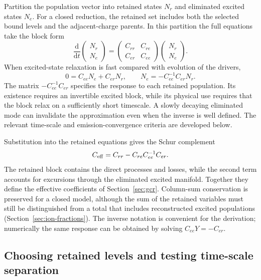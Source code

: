 \documentclass[11pt,a4paper]{article}
\newcommand{\dd}{\mathrm{d}}
\numberwithin{equation}{section}
\begin{document}
Partition the population vector into retained states $N_r$ and eliminated
excited states $N_e$. For a closed reduction, the retained set includes
both the selected bound levels and the adjacent-charge parents. In this
partition the full equations take the block form
\begin{equation}\label{eq:blocks}
 \frac{\dd}{\dd t}\begin{pmatrix}N_r\\N_e\end{pmatrix}
 =\begin{pmatrix}C_{rr}&C_{re}\\C_{er}&C_{ee}\end{pmatrix}
  \begin{pmatrix}N_r\\N_e\end{pmatrix}.
\end{equation}
When excited-state relaxation is fast compared with evolution of the drivers,
\begin{equation}\label{eq:qs}
 0=C_{ee}N_e+C_{er}N_r,
 \qquad N_e=-C_{ee}^{-1}C_{er}N_r.
\end{equation}
The matrix $-C_{ee}^{-1}C_{er}$ specifies the response to each retained
population. Its existence requires an invertible excited block, while
its physical use requires that the block relax on a sufficiently short
timescale. A slowly decaying eliminated mode can invalidate the
approximation even when the inverse is well defined. The relevant
time-scale and emission-convergence criteria are developed below.

Substitution into the retained equations gives the Schur complement
\begin{equation}\label{eq:schur}
 C_{\rm eff}=C_{rr}-C_{re}C_{ee}^{-1}C_{er}.
\end{equation}
The retained block contains the direct processes and losses, while the
second term accounts for excursions through the eliminated excited
manifold. Together they define the effective coefficients of
Section~\ref{sec:gcr}. Column-sum conservation is preserved for a closed
model, although the sum of the retained variables must still be
distinguished from a total that includes reconstructed excited
populations (Section~\ref{sec:ion-fractions}). The inverse notation is
convenient for the derivation; numerically the same response can be
obtained by solving $C_{ee}Y=-C_{er}$.

\subsection{Choosing retained levels and testing time-scale separation}\label{sec:metastables}
\end{document}
